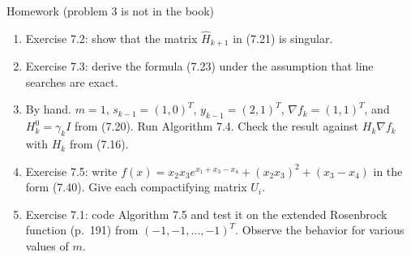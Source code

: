 \documentclass[aspectratio=169,12pt]{beamer}
\newcommand{\gradf}{\nabla f}
\begin{document}
\begin{frame}{Homework {\normalfont\small(problem 3 is not in the book)}}
  \begin{enumerate}\setlength\itemsep{0.5em}
    \item Exercise 7.2: show that the matrix $\hat H_{k+1}$ in (7.21) is singular.
    \item Exercise 7.3: derive the formula (7.23) under the assumption that line searches
      are exact.
    \item By hand. $m=1$, $s_{k-1}=(1,0)^{T}$, $y_{k-1}=(2,1)^{T}$, $\gradf_{k}=(1,1)^{T}$, and $H_{k}^{0}=\gamma_{k}I$
      from (7.20). Run Algorithm 7.4. Check the result against $H_{k}\gradf_{k}$ with $H_{k}$ from (7.16).
    \item Exercise 7.5: write $f(x)=x_{2}x_{3}e^{x_{1}+x_{3}-x_{4}}+(x_{2}x_{3})^{2}+(x_{3}-x_{4})$ in the form (7.40).
      Give each compactifying matrix $U_{i}$.
    \item Exercise 7.1: code Algorithm 7.5 and test it on the extended Rosenbrock function
      (p.~191) from $(-1,-1,\dots,-1)^{T}$. Observe the behavior for various values of $m$.
  \end{enumerate}
\end{frame}
\end{document}
